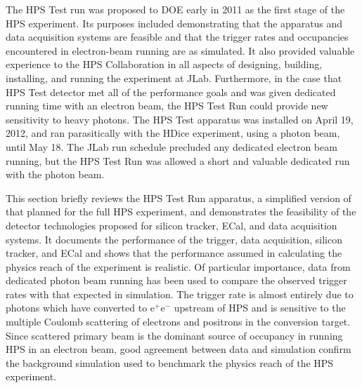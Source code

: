 The HPS Test run was proposed to DOE early in 2011 as the first stage of the HPS experiment. Its
purposes included demonstrating that the apparatus and data acquisition systems are feasible and
that the trigger rates and occupancies encountered in electron-beam running are as simulated.  It also
provided valuable experience to the HPS Collaboration in all aspects of designing, building, installing,
and running the experiment at JLab. Furthermore, in the case that HPS Test detector met all of the 
performance goals and was given dedicated running time with an electron beam, the HPS Test Run 
could provide new sensitivity to heavy photons. The HPS Test apparatus was installed on April 19, 2012, and 
ran parasitically with the HDice experiment, using a photon beam, until May 18. The JLab run schedule 
precluded any dedicated electron beam running, but the HPS Test Run was allowed a short and valuable
dedicated run with the photon beam.

This section briefly reviews the HPS Test Run apparatus, a simplified version of that 
planned for the full HPS experiment, and demonstrates the feasibility of the detector
technologies proposed for silicon tracker, ECal, and data acquisition systems. It documents the
performance of the trigger, data acquisition, silicon tracker, and ECal
and shows that the performance assumed in calculating the physics reach of the experiment is realistic.
Of particular importance, data from dedicated photon beam running has been used to compare
the observed trigger rates with that expected in simulation. The trigger rate is almost entirely due to
photons which have converted to e$^+$e$^-$ upstream of HPS and is sensitive to the multiple
Coulomb scattering of electrons and positrons in the conversion target.  Since scattered primary beam is the dominant 
source of occupancy in running HPS in an electron beam, good agreement between data and simulation 
confirm the background simulation used to benchmark the physics reach of the HPS experiment.

